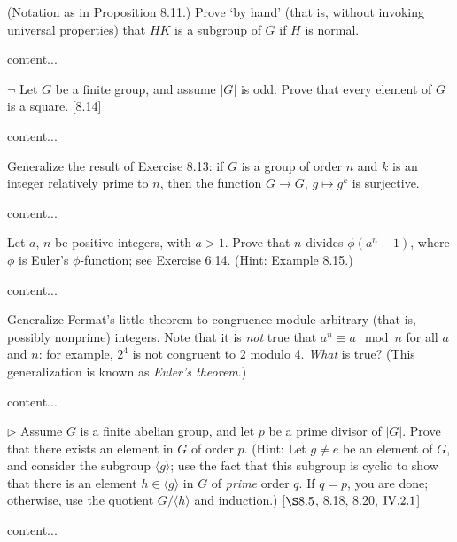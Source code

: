 \begin{exercise}
	(Notation as in Proposition 8.11.) Prove `by hand' (that is, without invoking universal properties) that $HK$ is a subgroup of $G$ if $H$ is normal.
\end{exercise}
\begin{solution}
	content...
\end{solution}

\begin{exercise}
	$\neg$ Let $G$ be a finite group, and assume $|G|$ is odd. Prove that every element of $G$ is a square. [8.14]
\end{exercise}
\begin{solution}
	content...
\end{solution}

\begin{exercise}
	Generalize the result of Exercise 8.13: if $G$ is a group of order $n$ and $k$ is an integer relatively prime to $n$, then the function $G \to G$, $g\mapsto g^k$ is surjective.
\end{exercise}
\begin{solution}
	content...
\end{solution}

\begin{exercise}
	Let $a$, $n$ be positive integers, with $a>1$. Prove that $n$ divides $\phi(a^n -1)$, where $\phi$ is Euler's $\phi$-function; see Exercise 6.14. (Hint: Example 8.15.)
\end{exercise}
\begin{solution}
	content...
\end{solution}

\begin{exercise}
	Generalize Fermat's little theorem to congruence module arbitrary (that is, possibly nonprime) integers. Note that it is \emph{not} true that $a^n \equiv a \mod n$ for all $a$ and $n$: for example, $2^4$ is not congruent to $2$ modulo 4. \emph{What} is true? (This generalization is known as \emph{Euler's theorem}.)
\end{exercise}
\begin{solution}
	content...
\end{solution}

\begin{exercise}
	$\triangleright$ Assume $G$ is a finite abelian group, and let $p$ be a prime divisor of $|G|$. Prove that there exists an element in $G$ of order $p$. (Hint: Let $g\neq e$ be an element of $G$, and consider the subgroup $\langle g \rangle$; use the fact that this subgroup is cyclic to show that there is an element $h\in \langle g \rangle$ in $G$ of \emph{prime} order $q$. If $q = p$, you are done; otherwise, use the quotient $G/\langle h \rangle$ and induction.) [$\S 8.5$, 8.18, 8.20, $\RNo{4}. 2.1$]
\end{exercise}
\begin{solution}
	content...
\end{solution}


